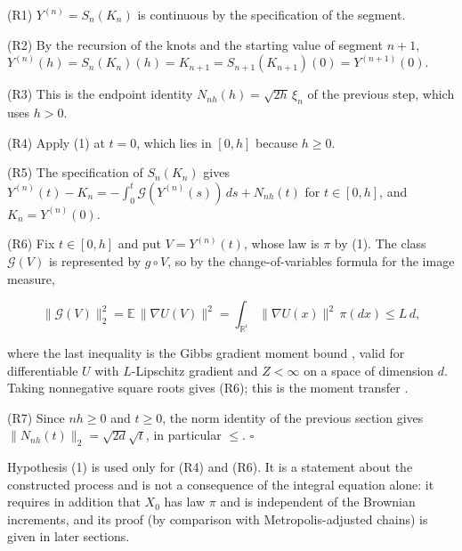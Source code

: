 \documentclass[11pt,a4paper]{article}
\begin{document}
(R1) \(Y^{(n)}=S_n(K_n)\) is continuous by the specification of the segment.




(R2) By the recursion of the knots and the starting value of segment \(n+1\), \(Y^{(n)}(h)=S_n(K_n)(h)=K_{n+1}=S_{n+1}(K_{n+1})(0)=Y^{(n+1)}(0)\).




(R3) This is the endpoint identity \(N_{nh}(h)=\sqrt{2h}\,\xi_n\) of the previous step, which uses \(h>0\).




(R4) Apply (1) at \(t=0\), which lies in \([0,h]\) because \(h\ge0\).




(R5) The specification of \(S_n(K_n)\) gives \(Y^{(n)}(t)-K_n=-\int_0^t\mathcal G(Y^{(n)}(s))\,ds+N_{nh}(t)\) for \(t\in[0,h]\), and \(K_n=Y^{(n)}(0)\).




(R6) Fix \(t\in[0,h]\) and put \(V=Y^{(n)}(t)\), whose law is \(\pi\) by (1). The class \(\mathcal G(V)\) is represented by \(g\circ V\), so by the change-of-variables formula for the image measure,


\[\|\mathcal G(V)\|_2^2=\mathbb E\,\|\nabla U(V)\|^2=\int_{\mathbb R^\iota}\|\nabla U(x)\|^2\,\pi(dx)\le L\,d,\]


where the last inequality is the Gibbs gradient moment bound \cite[Section~3.27.6]{LangevinLean2026ULASC}, valid for differentiable \(U\) with \(L\)-Lipschitz gradient and \(Z<\infty\) on a space of dimension \(d\). Taking nonnegative square roots gives (R6); this is the moment transfer \cite[Section~3.28.1]{LangevinLean2026ULASC}.




(R7) Since \(nh\ge0\) and \(t\ge0\), the norm identity of the previous section gives \(\|N_{nh}(t)\|_2=\sqrt{2d}\sqrt t\), in particular \(\le\). \(\square\)




Hypothesis (1) is used only for (R4) and (R6). It is a statement about the constructed process and is not a consequence of the integral equation alone: it requires in addition that \(X_0\) has law \(\pi\) and is independent of the Brownian increments, and its proof (by comparison with Metropolis-adjusted chains) is given in later sections.
\end{document}
